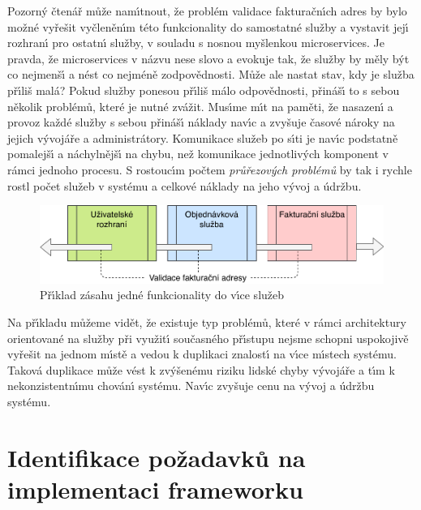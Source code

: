 Pozorn\'y čtenář může nam\'{\i}tnout, že problém validace fakturačn\'{\i}ch adres by
bylo možné vyřešit vyčleněn\'{\i}m této funkcionality
do samostatné služby a vystavit jej\'{\i} rozhran\'{\i} pro ostatn\'{\i} služby,
v souladu s nosnou myšlenkou microservices. Je pravda, že microservices
v názvu nese slovo  a evokuje tak, že služby by měly b\'yt co nejmenš\'{\i}
a nést co nejméně zodpovědnosti. Může ale nastat stav, kdy je služba př\'{\i}liš malá?
Pokud služby ponesou př\'{\i}liš málo odpovědnosti,
přináš\'{\i} to s sebou několik problémů, které je nutné zvážit. Mus\'{\i}me m\'{\i}t na paměti, že
nasazen\'{\i} a provoz každé služby s sebou přináš\'{\i} náklady nav\'{\i}c
a zvyšuje časové nároky na jejich v\'yvojáře a administrátory.
Komunikace služeb po s\'{\i}ti je nav\'{\i}c podstatně pomalejš\'{\i} a náchylnějš\'{\i} na
chybu, než komunikace jednotliv\'ych komponent v rámci jednoho procesu.
S rostouc\'{\i}m počtem \textit{průřezov\'ych problémů} by tak i rychle rostl
počet služeb v systému a celkové náklady na jeho v\'yvoj a údržbu.

\begin{figure}
    \centering
    \includegraphics[keepaspectratio=true, width=0.8\linewidth]{figures/service-cutting.pdf}
    \caption{Př\'{\i}klad zásahu jedné funkcionality do v\'{\i}ce služeb}
    \label{fig:service-cutting}
\end{figure}

Na př\'{\i}kladu můžeme vidět, že existuje typ problémů, které v rámci architektury
orientované na služby při využit\'{\i} současného př\'{\i}stupu nejsme schopni uspokojivě
vyřešit na jednom m\'{\i}stě a vedou k duplikaci znalost\'{\i} na v\'{\i}ce m\'{\i}stech systému.
Taková duplikace může vést k zv\'yšenému riziku lidské chyby v\'yvojáře a t\'{\i}m k
nekonzistentn\'{\i}mu chován\'{\i} systému. Nav\'{\i}c zvyšuje cenu na v\'yvoj a údržbu systému.

\section{Identifikace požadavků na implementaci frameworku}\label{sec:implementation-requirements}

